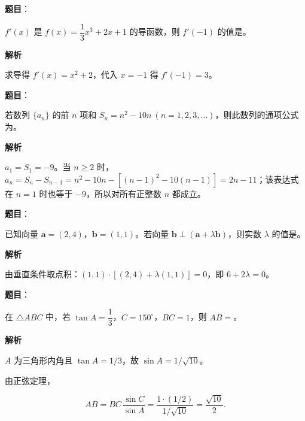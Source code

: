 \begin{answer}

\textbf{题目}：

$f'(x)$ 是 $f(x)=\dfrac{1}{3}x^3+2x+1$ 的导函数，则 $f'(-1)$ 的值是\gkblank{}。

\textbf{解析}

求导得 $f'(x)=x^2+2$，代入 $x=-1$ 得 $f'(-1)=3$。


\end{answer}
\begin{answer}

\textbf{题目}：

若数列 $\{a_n\}$ 的前 $n$ 项和 $S_n=n^2-10n\ (n=1,2,3,\ldots)$，则此数列的通项公式为\gkblank{}。

\textbf{解析}

$a_1=S_1=-9$。当 $n\geq2$ 时，$a_n=S_n-S_{n-1}=n^2-10n-[(n-1)^2-10(n-1)]=2n-11$；该表达式在 $n=1$ 时也等于 $-9$，所以对所有正整数 $n$ 都成立。


\end{answer}
\begin{answer}

\textbf{题目}：

已知向量 $\boldsymbol a=(2,4)$，$\boldsymbol b=(1,1)$。若向量 $\boldsymbol b\perp(\boldsymbol a+\lambda\boldsymbol b)$，则实数 $\lambda$ 的值是\gkblank{}。

\textbf{解析}

由垂直条件取点积：$(1,1)\cdot[(2,4)+\lambda(1,1)]=0$，即 $6+2\lambda=0$。


\end{answer}
\begin{answer}

\textbf{题目}：

在 $\triangle ABC$ 中，若 $\tan A=\dfrac{1}{3}$，$C=150^\circ$，$BC=1$，则 $AB=$\gkblank{}。

\textbf{解析}

$A$ 为三角形内角且 $\tan A=1/3$，故 $\sin A=1/\sqrt{10}$。

由正弦定理，

\nopagebreak[4]
\[AB=BC\,\dfrac{\sin C}{\sin A}=\dfrac{1\cdot(1/2)}{1/\sqrt{10}}=\dfrac{\sqrt{10}}2.\]


\end{answer}
